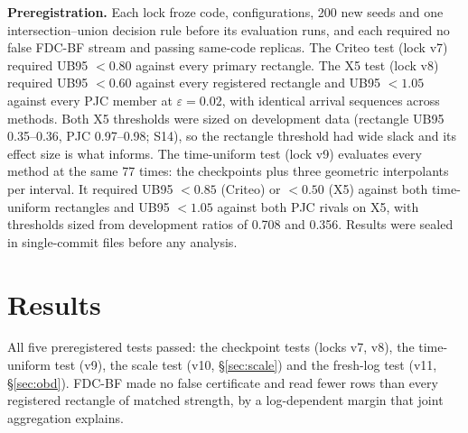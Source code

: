 \documentclass[sigconf,anonymous,review]{acmart}
\newcommand{\eps}{\varepsilon}
\begin{document}
\textbf{Preregistration.} Each lock froze code, configurations, 200 new seeds and one intersection--union decision rule before its evaluation runs, and each required no false FDC-BF stream and passing same-code replicas. The Criteo test (lock v7) required UB95 $< 0.80$ against every primary rectangle. The X5 test (lock v8) required UB95 $< 0.60$ against every registered rectangle and UB95 $< 1.05$ against every PJC member at $\eps = 0.02$, with identical arrival sequences across methods. Both X5 thresholds were sized on development data (rectangle UB95 0.35--0.36, PJC 0.97--0.98; S14), so the rectangle threshold had wide slack and its effect size is what informs. The time-uniform test (lock v9) evaluates every method at the same 77 times: the checkpoints plus three geometric interpolants per interval. It required UB95 $< 0.85$ (Criteo) or $< 0.50$ (X5) against both time-uniform rectangles and UB95 $< 1.05$ against both PJC rivals on X5, with thresholds sized from development ratios of 0.708 and 0.356. Results were sealed in single-commit files before any analysis.

\section{Results}\label{sec:results}

All five preregistered tests passed: the checkpoint tests (locks v7, v8), the time-uniform test (v9), the scale test (v10, \S\ref{sec:scale}) and the fresh-log test (v11, \S\ref{sec:obd}). FDC-BF made no false certificate and read fewer rows than every registered rectangle of matched strength, by a log-dependent margin that joint aggregation explains.
\end{document}
